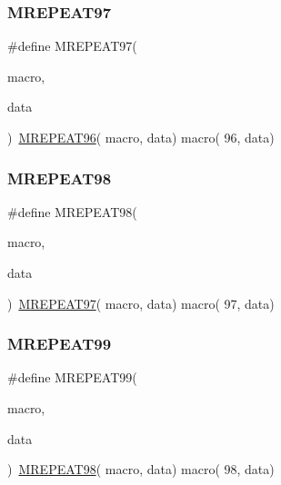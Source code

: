 \mbox{\label{group__group__sam0__utils__mrepeat_ga657eb71671586947acb4f1d9eea4ad80}} 
\subsubsection{\texorpdfstring{MREPEAT97}{MREPEAT97}}
{\footnotesize\ttfamily \#define M\+R\+E\+P\+E\+A\+T97(\begin{DoxyParamCaption}\item[{}]{macro,  }\item[{}]{data }\end{DoxyParamCaption})~\mbox{\hyperlink{group__group__sam0__utils__mrepeat_ga0b773eb3863eaca9403e8db99a4073e6}{M\+R\+E\+P\+E\+A\+T96}}( macro, data)   macro( 96, data)}

\mbox{\label{group__group__sam0__utils__mrepeat_ga5488749314737100b1d663aecd83026c}} 
\subsubsection{\texorpdfstring{MREPEAT98}{MREPEAT98}}
{\footnotesize\ttfamily \#define M\+R\+E\+P\+E\+A\+T98(\begin{DoxyParamCaption}\item[{}]{macro,  }\item[{}]{data }\end{DoxyParamCaption})~\mbox{\hyperlink{group__group__sam0__utils__mrepeat_ga657eb71671586947acb4f1d9eea4ad80}{M\+R\+E\+P\+E\+A\+T97}}( macro, data)   macro( 97, data)}

\mbox{\label{group__group__sam0__utils__mrepeat_ga6f0bcd4130a9efc978ec43537d0ccb57}} 
\subsubsection{\texorpdfstring{MREPEAT99}{MREPEAT99}}
{\footnotesize\ttfamily \#define M\+R\+E\+P\+E\+A\+T99(\begin{DoxyParamCaption}\item[{}]{macro,  }\item[{}]{data }\end{DoxyParamCaption})~\mbox{\hyperlink{group__group__sam0__utils__mrepeat_ga5488749314737100b1d663aecd83026c}{M\+R\+E\+P\+E\+A\+T98}}( macro, data)   macro( 98, data)}

